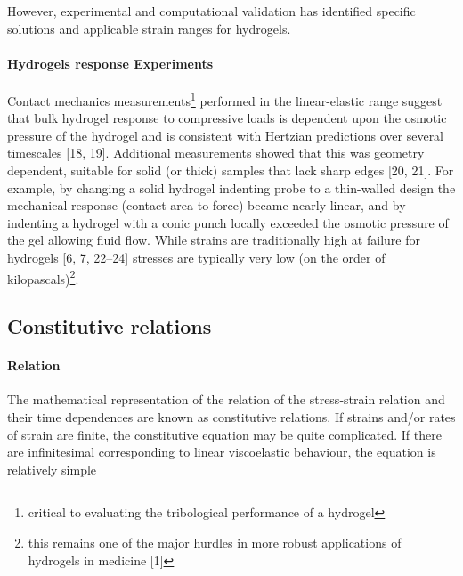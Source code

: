 However, experimental and computational validation has identified specific solutions and applicable strain ranges for hydrogels\citep{bonyadiReviewFrictionLubrication2020}.%


\paragraph{Hydrogels response Experiments} Contact mechanics measurements\footnote{critical to evaluating the tribological performance of a hydrogel} performed in the linear-elastic range suggest that bulk hydrogel response to compressive loads is dependent upon the osmotic pressure of the hydrogel and is consistent with Hertzian predictions over several timescales [18, 19]. 
Additional measurements showed that this was geometry dependent, suitable for solid (or thick) samples that lack sharp edges [20, 21]. 
For example, by changing a solid hydrogel indenting probe to a thin-walled design the mechanical response (contact area to force) became nearly linear, and by indenting a hydrogel with a conic punch locally exceeded the osmotic pressure of the gel allowing fluid flow. 
While strains are traditionally high at failure for hydrogels [6, 7, 22–24] stresses are typically very low (on the order of kilopascals)\footnote{this remains one of the major hurdles in more robust applications of hydrogels in medicine [1]}\citep{bonyadiReviewFrictionLubrication2020}.


\subsection{Constitutive relations}

\paragraph{Relation} The mathematical representation of the relation of the stress-strain relation and their time dependences are known as constitutive relations.
If strains and/or rates of strain are finite, the constitutive equation may be quite complicated.
If there are infinitesimal corresponding to linear viscoelastic behaviour, the equation is relatively simple





